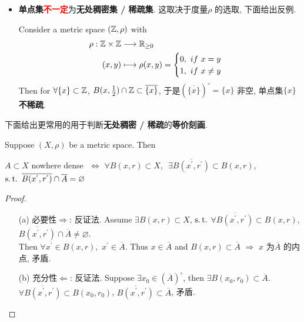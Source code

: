 \begin{defn}
\begin{rmk}
\begin{itemize}
				\item \textbf{单点集}\textcolor{red}{\textbf{不一定}}为\textbf{无处稠密集 / 稀疏集}. 这取决于度量$\rho$ 的选取, 下面给出反例.
				\begin{example}\label{ex 1.2.2}
					Consider a metric space $(\mathbb{Z} , \rho)$ with
					\begin{align}
						\rho : \mathbb{Z} \times \mathbb{Z} &\longrightarrow \mathbb{R}_{\geq 0} \\
						(x , y) &\longmapsto \rho(x , y) = \begin{cases}
							0 , \,\, if \,\, x = y \\
							1 , \,\, if \,\, x \neq y
						\end{cases}
					\end{align}
					Then for $\forall \{ x \} \subset \mathbb{Z}$, $B(x , \frac{1}{2}) \cap \mathbb{Z} \subset \overline{\{ x \}}$, 于是$\left( \overline{\{ x \}} \right)^\circ = \{ x \}$ 非空, 单点集$\{ x \}$ \textbf{不稀疏}.
				\end{example}
			\end{itemize}
		\end{rmk}
	\end{defn}
	
	\newpage
	
	下面给出更常用的用于判断\textbf{无处稠密 / 稀疏}的\textbf{等价刻画}.
	\begin{proposition}\label{prop 1.2.2}
		Suppose $(X , \rho)$ be a metric space. Then
		\begin{center}
			$A \subset X$ nowhere dense $\,\, \Leftrightarrow \,\, \forall B(x , r) \subset X$, $\,\, \exists \overline{B(x^{'} , r^{'})} \subset B(x , r)$, $\operatorname{s.t.} \,\, \overline{B(x^{'} , r^{'})} \cap \overline{A} = \varnothing$
		\end{center}
		
		\vspace{4em}
		
		\begin{proof}
			\begin{enumerate}
				\item[(a)] 必要性$\Rightarrow$: 反证法. Assume $\exists B(x , r) \subset X$, $\operatorname{s.t.}$ $\forall \overline{B(x^{'} , r^{'})} \subset B(x , r)$, $\overline{B(x^{'} , r^{'})} \cap \overline{A} \neq \varnothing$. \\
				Then $\forall x^{'} \in B(x , r), \,\, x^{'} \in \overline{A}$. Thus $x \in \overline{A}$ and $B(x , r) \subset \overline{A} \,\, \Rightarrow \,\, x$ 为$\overline{A}$ 的内点, 矛盾.
				
				\vspace{1em}
				
				\item[(b)] 充分性$\Leftarrow$: 反证法. Suppose $\exists x_0 \in \left( \overline{A} \right)^\circ$, then $\exists B(x_0 , r_0) \subset \overline{A}$. \\
				$\forall \overline{B(x^{'} , r^{'})} \subset B(x_0 , r_0)$, $\overline{B(x^{'} , r^{'})} \subset \overline{A}$, 矛盾.
			\end{enumerate}
		\end{proof}
	\end{proposition}

